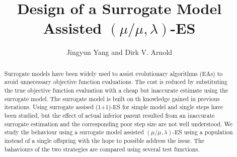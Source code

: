 \documentclass[sigconf,natbib=false]{acmart}
\begin{document}
\title{Design of a Surrogate Model Assisted $(\mu/\mu,\lambda)$-ES}


\author{Jingyun Yang and Dirk V. Arnold}
\orcid{}






\begin{abstract}
Surrogate models have been widely used to assist evolutionary algorithms (EAs) to avoid unnecessary objective function evaluations. The cost is reduced by substituting the true objective function evaluation with a cheap but inaccurate estimate using the surrogate model. The surrogate model is built on th knowledge gained in previous iterations. Using surrogate assised (1+1)-ES for simple model and single steps have been studied, but the effect of actual inferior parent resulted from an inaccurate surrogate estimation and the corresponding poor step size are not well understood. We study the behaviour using a surrogate model assisted $(\mu/\mu,\lambda)$-ES using a population instead of a single offspring with the hope to possible address the issue. The bahaviours of the two strategies are compared using several test functions.
\end{abstract}

%
%
\end{document}
